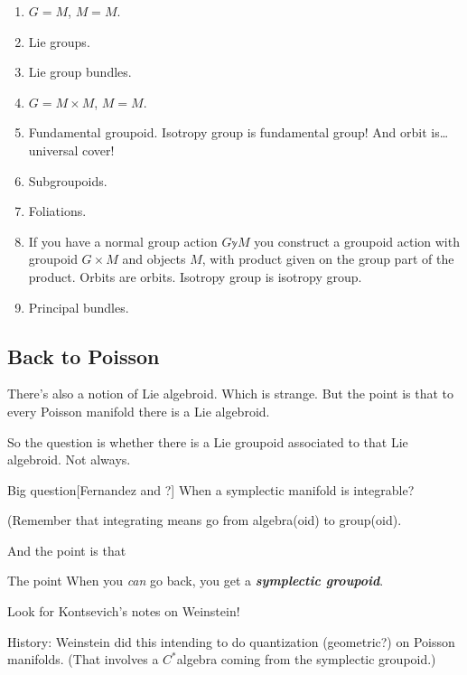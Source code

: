 \begin{example}\leavevmode
\begin{enumerate}
\item \(G=M\),  \(M=M\).
 \item Lie groups.
	\item Lie group bundles.
\item \(G=M \times M\), \(M =M\).
 \item Fundamental groupoid. Isotropy group is fundamental group! And orbit is…\clearpage universal cover!
\item Subgroupoids.
\item  Foliations.
\item If you have a normal group action \(G \mathbb{y} M\) you construct a groupoid action with groupoid \(G \times M\) and objects \(M\), with product given on the group part of the product. Orbits are orbits. Isotropy group is isotropy group.
 \item Principal bundles.
\end{enumerate}
\end{example}

\subsection{Back to Poisson}

There's also a notion of Lie algebroid. Which is strange. But the point is that to every Poisson manifold there is a Lie algebroid.

So the question is whether there is a Lie groupoid associated to that Lie algebroid. Not always.

\begin{thing6}{Big question}[Fernandez and ?]\leavevmode
When a symplectic manifold is integrable?
\end{thing6}

(Remember that integrating means go from algebra(oid) to group(oid).

And the point is that
\begin{thing7}{The point}\leavevmode
When you \textit{can} go back, you get a \textit{\textbf{symplectic groupoid}}. 
\end{thing7}

\begin{remark}\leavevmode
Look for Kontsevich's notes on Weinstein!
\end{remark}

\begin{remark}\leavevmode
History: Weinstein did this intending to do quantization (geometric?) on Poisson manifolds. (That involves a \(C^*\)algebra coming from the symplectic groupoid.)
\end{remark}

